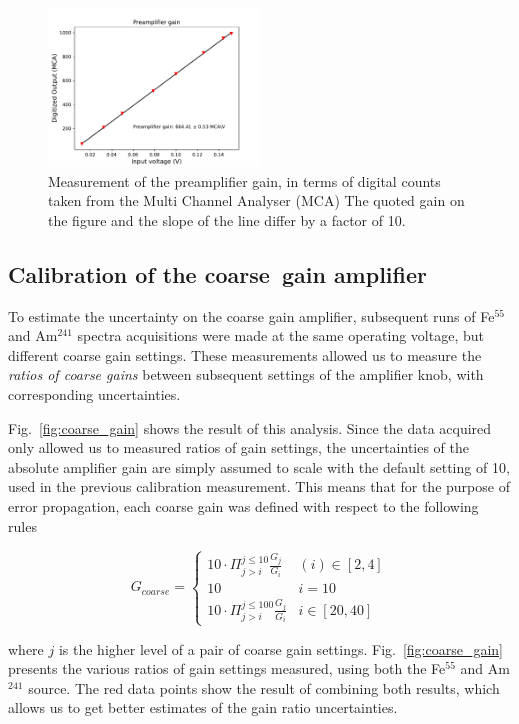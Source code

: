 \begin{figure}[htb]
  \includegraphics[scale=0.5,width=0.5\textwidth]{graphics/preamp_gain_calibration_plus_conversionfactor.pdf}
  \caption{Measurement of the preamplifier gain, in terms of digital counts taken from the Multi Channel Analyser (MCA) The quoted gain on the figure and the slope of the line differ by a factor of 10.}
  \label{fig:preamp_gain_mca}
\end{figure}


\subsection{Calibration of the coarse~gain amplifier}
\label{sec:coarse}
To estimate the uncertainty on the coarse gain amplifier, subsequent runs of Fe$^{55}$ and Am$^{241}$ spectra acquisitions were made at the same operating voltage, but different coarse gain settings. These measurements allowed us to measure the \textit{ratios of coarse gains} between subsequent settings of the amplifier knob, with corresponding uncertainties.

Fig.~\ref{fig:coarse_gain} shows the result of this analysis. Since the data acquired only allowed us to measured ratios of gain settings, the uncertainties of the absolute amplifier gain are simply assumed to scale with the default setting of 10, used in the previous calibration measurement. This means that for the purpose of error propagation, each coarse gain was defined with respect to the following rules

$$
G_{coarse} = \left\{
\begin{array}{ll} 
  10\cdot\Pi_{j>i}^{j\leq10}\frac{G_{j}}{G_{i}} & (i) \in [2,4] \\
  10 & i=10 \\
  10\cdot\Pi_{j>i}^{j\leq 100}\frac{G_{j}}{G_{i}} & i \in [20,40] 
\end{array}
\right.
$$

where $j$ is the higher level of a pair of coarse gain settings. Fig.~\ref{fig:coarse_gain} presents the various ratios of gain settings measured, using both the Fe$^{55}$ and Am$^{241}$ source. The red data points show the result of combining both results, which allows us to get better estimates of the gain ratio uncertainties.

